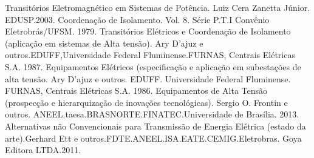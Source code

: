 \begin{thebibliography}{99}
 Transitórios Eletromagnético em Sistemas de Potência. Luiz Cera Zanetta Júnior. EDUSP.2003.
 Coordenação de Isolamento. Vol. 8. Série P.T.I Convênio Eletrobrás/UFSM. 1979.
 Transitórios Elétricos e Coordenação de Isolamento (aplicação em sistemas de Alta tensão). Ary D’ajuz e outros.EDUFF,Universidade Federal Fluminense.FURNAS, Centrais Elétricas S.A. 1987.
 Equipamentos Elétricos (especificação e aplicação em subestações de alta tensão. Ary D’ajuz e outros. EDUFF. Universidade Federal Fluminense. FURNAS, Centrais Elétricas S.A. 1986.
 Equipamentos de Alta Tensão (prospecção e hierarquização de inovações tecnológicas). Sergio O. Frontin e outros. ANEEL.taesa.BRASNORTE.FINATEC.Universidade de Brasília. 2013.
 Alternativas não Convencionais para Transmissão de Energia Elétrica (estado da arte).Gerhard Ett e outros.FDTE.ANEEL.ISA.EATE.CEMIG.Eletrobras. Goya Editora LTDA.2011.

\end{thebibliography}

\pagebreak